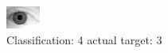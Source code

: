 \begin{figure}[h!]
\begin{center}
\includegraphics[width=0.60\columnwidth]{figures/ID2147_class_4_target_3.png}
\end{center}
\caption{ Classification: 4 actual target: 3}
\label{fig:ID2147_class_4_target_3}
\end{figure}
